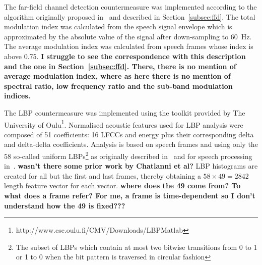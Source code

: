 

The far-field channel detection countermeasure was implemented according to the algorithm originally proposed in~\cite{Villalba2011} and described in Section~\ref{subsec:ffd}. The total modulation index was calculated from the speech signal envelope which is approximated by the absolute value of the signal after down-sampling to 60~Hz.  The average modulation index was calculated from speech frames whose index is above 0.75.  {\bfseries I struggle to see the correspondence with this description and the one in Section~\ref{subsec:ffd}.  There, there is no mention of average modulation index, where as here there is no mention of spectral ratio, low frequency ratio and the sub-band modulation indices.}

The LBP countermeasure was implemented using the toolkit provided by The University of Oulu\footnote{http://www.cse.oulu.fi/CMV/Downloads/LBPMatlab}.
Normalised acoustic features used for LBP analysis were composed of 51 coefficients: 16 LFCCs and energy plus their corresponding delta and delta-delta coefficients.  Analysis is based on speech frames and using only the $58$ so-called uniform LBPs\footnote{The subset of LBPs which contain at most two bitwise transitions from 0 to 1 or 1 to 0 when the bit pattern is traversed in circular fashion} as originally described in~\cite{Ojala2002} and for speech processing in~\cite{Alegre2013a}.  {\bfseries wasn't there some prior work by Chatlanni et al?}  LBP histograms are created for all but the first and last frames, thereby obtaining a $58 \times 49 = 2842$ length feature vector for each vector. {\bfseries where does the 49 come from?  To what does a frame refer?  For me, a frame is time-dependent so I don't understand how the 49 is fixed???}


